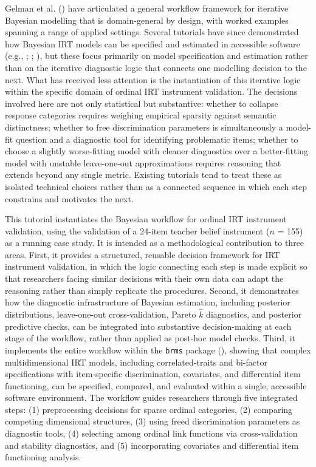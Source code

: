 \documentclass[
  man,
  floatsintext,
  longtable,
  nolmodern,
  notxfonts,
  notimes,
  colorlinks=true,linkcolor=blue,citecolor=blue,urlcolor=blue]{apa7}
\begin{document}
Gelman et al. () have articulated a
general workflow framework for iterative Bayesian modelling that is
domain-general by design, with worked examples spanning a range of
applied settings. Several tutorials have since demonstrated how Bayesian
IRT models can be specified and estimated in accessible software (e.g.,
;
;
), but these focus
primarily on model specification and estimation rather than on the
iterative diagnostic logic that connects one modelling decision to the
next. What has received less attention is the instantiation of this
iterative logic within the specific domain of ordinal IRT instrument
validation. The decisions involved here are not only statistical but
substantive: whether to collapse response categories requires weighing
empirical sparsity against semantic distinctness; whether to free
discrimination parameters is simultaneously a model-fit question and a
diagnostic tool for identifying problematic items; whether to choose a
slightly worse-fitting model with cleaner diagnostics over a
better-fitting model with unstable leave-one-out approximations requires
reasoning that extends beyond any single metric. Existing tutorials tend
to treat these as isolated technical choices rather than as a connected
sequence in which each step constrains and motivates the next.

This tutorial instantiates the Bayesian workflow for ordinal IRT
instrument validation, using the validation of a 24-item teacher belief
instrument (\(n\) = 155) as a running case study. It is intended as a
methodological contribution to three areas. First, it provides a
structured, reusable decision framework for IRT instrument validation,
in which the logic connecting each step is made explicit so that
researchers facing similar decisions with their own data can adapt the
reasoning rather than simply replicate the procedures. Second, it
demonstrates how the diagnostic infrastructure of Bayesian estimation,
including posterior distributions, leave-one-out cross-validation,
Pareto \(\hat{k}\) diagnostics, and posterior predictive checks, can be
integrated into substantive decision-making at each stage of the
workflow, rather than applied as post-hoc model checks. Third, it
implements the entire workflow within the \texttt{brms} package
(), showing that complex
multidimensional IRT models, including correlated-traits and bi-factor
specifications with item-specific discrimination, covariates, and
differential item functioning, can be specified, compared, and evaluated
within a single, accessible software environment. The workflow guides
researchers through five integrated steps: (1) preprocessing decisions
for sparse ordinal categories, (2) comparing competing dimensional
structures, (3) using freed discrimination parameters as diagnostic
tools, (4) selecting among ordinal link functions via cross-validation
and stability diagnostics, and (5) incorporating covariates and
differential item functioning analysis.
\end{document}
